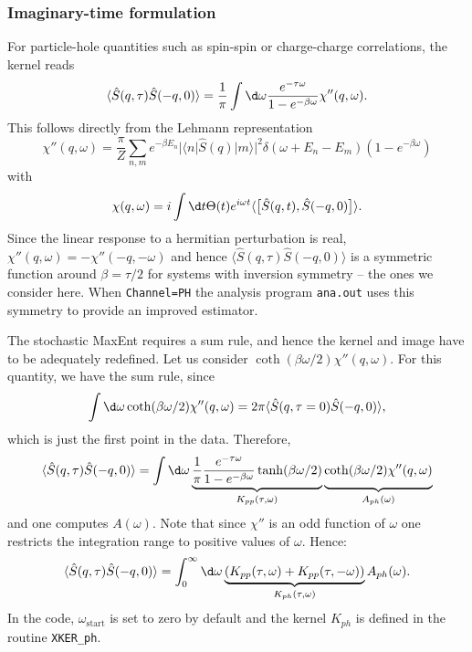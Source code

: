 \subsubsection*{Imaginary-time formulation}
 For particle-hole quantities such as spin-spin or charge-charge correlations, 
the kernel reads
\begin{equation}
	\langle \hat{S}(q,\tau) \hat{S}(-q,0) \rangle  = \frac{1}{\pi} 
   \int \d \omega  \frac{e^{- \tau \omega} }{ 1 - e^{-\beta  \omega} } \chi''(q,\omega).
\end{equation}
This follows directly from the  Lehmann representation
\begin{equation}
 \chi''(q,\omega)  = \frac{\pi}{Z} \sum_{n,m} e^{-\beta E_n} |\langle n | \hat{S}(q) | m \rangle |^2 
\delta ( \omega + E_n - E_m) \left( 1 - e^{-\beta  \omega} \right) 
\end{equation}
with 
\begin{equation*}
   \chi(q,\omega)  = i \int \d t \Theta(t)  e^{i \omega t} \langle \big[ \hat{S}(q,t), \hat{S}(-q,0) \big] \rangle .
\end{equation*}
Since the linear response to a hermitian perturbation  is real, $\chi''(q,\omega)  = - \chi''(-q,-\omega)$ and hence 
$\langle \hat{S}(q,\tau) \hat{S}(-q,0) \rangle $ is a symmetric function around $\beta= \tau/2$ for systems with 
inversion symmetry -- the ones we consider here.  When  \texttt{Channel=PH}  the analysis program \texttt{ana.out} uses this symmetry to provide an improved estimator. 

The  stochastic MaxEnt requires a sum rule, and hence the kernel and image have to be adequately redefined. 
Let us consider $\coth(\beta \omega/2) \chi''(q,\omega)$. For this quantity, we have the sum rule, since
\begin{equation}
	\int \d \omega 	\coth(\beta \omega/2) \chi''(q,\omega) = 
  2 \pi \langle \hat{S}(q,\tau=0) \hat{S}(-q,0) \rangle ,
\end{equation}
which is just the first point in the data. Therefore,
\begin{equation}
  \label{eqn:A_ph_def}
	\langle \hat{S}(q,\tau) \hat{S}(-q,0) \rangle  =  
       \int \d \omega  \underbrace{ \frac{1}{\pi} \frac{e^{- \tau \omega} }
            { 1 - e^{-\beta  \omega} } \tanh(\beta \omega/2)  }_{K_{pp}(\tau,\omega)} 
       \underbrace{ \coth(\beta \omega/2) \chi''(q,\omega) \vphantom{\frac{1}{2-1}} }_{A_{ph}(\omega)} 
\end{equation}
and one computes $A(\omega)$.
Note that since $\chi'' $ is an odd function of $\omega$ one restricts the integration range to positive values of $\omega$. 
Hence: 
\begin{equation}
	\langle \hat{S}(q,\tau) \hat{S}(-q,0) \rangle  =  
       \int_{0}^{\infty}  \d \omega \underbrace{\left( K_{pp}(\tau,\omega)  + K_{pp}(\tau,-\omega) \right)}_{K_{ph}(\tau,\omega)}  A_{ph}(\omega).
\end{equation}
In the code, $\omega_\mathrm{start}$ is set to zero by default and the kernel $K_{ph}$ is defined in the  routine \texttt{XKER\_ph}.

